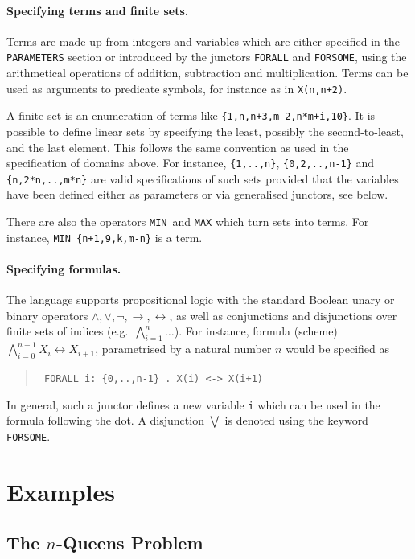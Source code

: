\documentclass[twoside]{article}
\begin{document}
\paragraph*{Specifying terms and finite sets.} 
Terms are made up from integers and variables which are either specified in the \texttt{PARAMETERS} section or introduced by the junctors 
\texttt{FORALL} and \texttt{FORSOME}, using the arithmetical operations of addition, subtraction and multiplication. Terms can be used
as arguments to predicate symbols, for instance as in \texttt{X(n,n+2)}.

A finite set is an enumeration of terms like \texttt{\{1,n,n+3,m-2,n*m+i,10\}}. It is possible to define linear sets by specifying the
least, possibly the second-to-least, and the last element. This follows the same convention as used in the specification of domains
above. For instance, \texttt{\{1,..,n\}}, \texttt{\{0,2,..,n-1\}} and \texttt{\{n,2*n,..,m*n\}} are valid specifications of such sets
provided that the variables have been defined either as parameters or via generalised junctors, see below.

There are also the operators \texttt{MIN} and \texttt{MAX} which turn sets into terms. For instance, \texttt{MIN \{n+1,9,k,m-n\}} is a term.


\paragraph*{Specifying formulas.}
The \DiMo language supports propositional logic with the standard Boolean unary or binary operators $\wedge,\vee,\neg,\to,\leftrightarrow$, 
as well as conjunctions and disjunctions over finite sets of indices (e.g.\ $\bigwedge_{i=1}^n \ldots$). For instance, formula (scheme)
$\bigwedge_{i=0}^{n-1} X_i \leftrightarrow X_{i+1}$, parametrised by a natural number $n$ would be specified as
\begin{quote} \tt
  FORALL i: \{0,..,n-1\} . X(i) <-> X(i+1)
\end{quote}
In general, such a junctor defines a new variable \texttt{i} which can be used in the formula following the dot. A disjunction $\bigvee$ 
is denoted using the keyword \texttt{FORSOME}.


 


\section{Examples}

\subsection{The $n$-Queens Problem}\label{n-queens}
\end{document}

